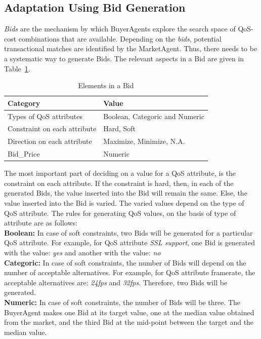 \documentclass[10pt,journal,compsoc]{IEEEtran}
\begin{document}
\subsection{Adaptation Using Bid Generation}\label{bid_generation}

\textit{Bids} are the mechanism by which BuyerAgents explore the search space of QoS-cost combinations that are available. Depending on the \textit{bids}, potential transactional matches are identified by the MarketAgent. Thus, there needs to be a systematic way to generate Bids. The relevant aspects in a Bid are given in Table~\ref{tbl:bid_elements}.

\begin{table}
\centering
\begin{tabular}{p{7cm}p{7cm}}
\toprule
Category & Value \\
\midrule
Types of QoS attributes & Boolean, Categoric  and Numeric \\
Constraint on each attribute & Hard, Soft \\ 
Direction on each attribute & Maximize, Minimize, N.A. \\ 
Bid\_Price & Numeric \\
\bottomrule
\end{tabular}
\caption{Elements in a Bid \label{tbl:bid_elements}}
\end{table}

The most important part of deciding on a value for a QoS attribute, is the constraint on each attribute. If the constraint is hard, then, in each of the generated Bids, the value inserted into the Bid will remain the same. Else, the value inserted into the Bid is varied. The varied values depend on the type of QoS attribute. The rules for generating QoS values, on the basis of type of attribute are as follows:\\
\textbf{Boolean:} In case of soft constraints, two Bids will be generated for a particular QoS attribute. For example, for QoS attribute \textit{SSL support}, one Bid is generated with the value: \textit{yes} and another with the value: \textit{no}\\
\textbf{Categoric:} In case of soft constraints, the number of Bids will depend on the number of acceptable alternatives. For example, for QoS attribute {framerate}, the acceptable alternatives are: \textit{24fps} and \textit{32fps}. Therefore, two Bids will be generated. \\
\textbf{Numeric:} In case of soft constraints, the number of Bids will be three. The BuyerAgent makes one Bid at its target value, one at the median value obtained from the market, and the third Bid at the mid-point between the target and the median value.
\end{document}
